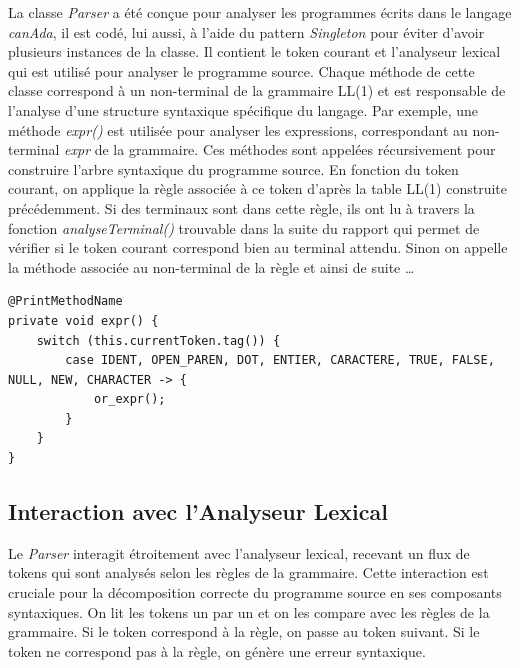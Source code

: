 \documentclass[french,a4paper]{article}
\begin{document}
    La classe \textit{Parser} a été conçue pour analyser les programmes écrits dans le langage \textit{canAda}, il est codé, lui aussi, à l'aide du pattern \textit{Singleton} pour éviter d'avoir plusieurs instances de la classe.
    Il contient le token courant et l'analyseur lexical qui est utilisé pour analyser le programme source.
    Chaque méthode de cette classe correspond à un non-terminal de la grammaire LL(1) et est responsable de l'analyse d'une structure syntaxique spécifique du langage.
    Par exemple, une méthode \textit{expr()} est utilisée pour analyser les expressions, correspondant au non-terminal \textit{expr} de la grammaire.
    Ces méthodes sont appelées récursivement pour construire l'arbre syntaxique du programme source.
    En fonction du token courant, on applique la règle associée à ce token d'après la table LL(1) construite précédemment.
    Si des terminaux sont dans cette règle, ils ont lu à travers la fonction \textit{analyseTerminal()} trouvable dans la suite du rapport qui permet de vérifier si le token courant correspond bien au terminal attendu.
    Sinon on appelle la méthode associée au non-terminal de la règle et ainsi de suite \dots

    \begin{lstlisting}[label={lst:lstlisting10}]
@PrintMethodName
private void expr() {
    switch (this.currentToken.tag()) {
        case IDENT, OPEN_PAREN, DOT, ENTIER, CARACTERE, TRUE, FALSE, NULL, NEW, CHARACTER -> {
            or_expr();
        }
    }
}
    \end{lstlisting}


    \subsection{Interaction avec l'Analyseur Lexical}\label{subsec:interaction-avec-l'analyseur-lexical}

    Le \textit{Parser} interagit étroitement avec l'analyseur lexical, recevant un flux de tokens qui sont analysés selon les règles de la grammaire.
    Cette interaction est cruciale pour la décomposition correcte du programme source en ses composants syntaxiques.
    On lit les tokens un par un et on les compare avec les règles de la grammaire.
    Si le token correspond à la règle, on passe au token suivant.
    Si le token ne correspond pas à la règle, on génère une erreur syntaxique.
\end{document}
